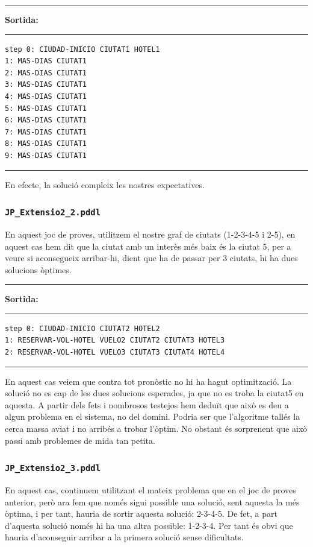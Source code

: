 \documentclass[11pt,a4paper]{article}
\begin{document}
\begin{samepage}
\medskip
\noindent
\rule{0.1\textwidth}{0.5mm}
\textbf{Sortida:}
\rule{0.76\textwidth}{0.5mm}
\begin{verbatim}
step 0: CIUDAD-INICIO CIUTAT1 HOTEL1
1: MAS-DIAS CIUTAT1
2: MAS-DIAS CIUTAT1
3: MAS-DIAS CIUTAT1
4: MAS-DIAS CIUTAT1
5: MAS-DIAS CIUTAT1
6: MAS-DIAS CIUTAT1
7: MAS-DIAS CIUTAT1
8: MAS-DIAS CIUTAT1
9: MAS-DIAS CIUTAT1
\end{verbatim}
\rule{\textwidth}{0.5mm}
\medskip
\end{samepage}

En efecte, la solució compleix les nostres expectatives.

\subsubsection*{\texttt{JP\_Extensio2\_2.pddl}}

En aquest joc de proves, utilitzem el nostre graf de ciutats (1-2-3-4-5 i 2-5), en aquest cas hem dit que la ciutat amb un interès més baix és la ciutat 5, per a veure si aconsegueix arribar-hi, dient que ha de passar per 3 ciutats, hi ha dues solucions òptimes.

\begin{samepage}
\medskip
\noindent
\rule{0.1\textwidth}{0.5mm}
\textbf{Sortida:}
\rule{0.76\textwidth}{0.5mm}
\begin{verbatim}
step 0: CIUDAD-INICIO CIUTAT2 HOTEL2
1: RESERVAR-VOL-HOTEL VUELO2 CIUTAT2 CIUTAT3 HOTEL3
2: RESERVAR-VOL-HOTEL VUELO3 CIUTAT3 CIUTAT4 HOTEL4
\end{verbatim}
\rule{\textwidth}{0.5mm}
\medskip
\end{samepage}

En aquest cas veiem que contra tot pronòstic no hi ha hagut optimització. La solució no es cap de les dues solucions esperades, ja que no es troba la ciutat5 en aquesta. A partir dels fets i nombrosos testejos hem deduït que això es deu a algun problema en el sistema, no del domini. Podria ser que l'algoritme tallés la cerca massa aviat i no arribés a trobar l'òptim. No obstant és sorprenent que això passi amb problemes de mida tan petita.

\subsubsection*{\texttt{JP\_Extensio2\_3.pddl}}

En aquest cas, continuem utilitzant el mateix problema que en el joc de proves anterior, però ara fem que només sigui possible una solució, sent aquesta la més òptima, i per tant, hauria de sortir aquesta solució: 2-3-4-5. De fet, a part d'aquesta solució només hi ha una altra possible: 1-2-3-4. Per tant és obvi que hauria d'aconseguir arribar a la primera solució sense dificultats.
\end{document}
